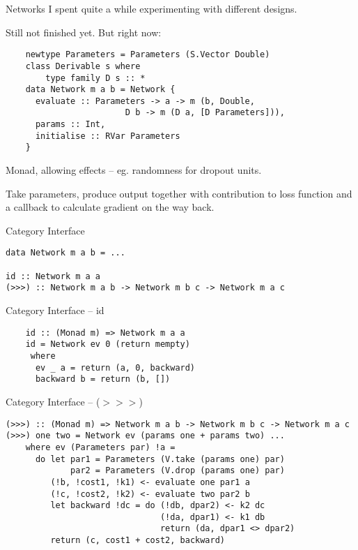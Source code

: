 \documentclass[10pt]{beamer}
\newenvironment{xframe}[1][]{\begin{frame}[fragile,environment=xframe,#1]}{\end{frame}}
\begin{document}
\begin{xframe}{Networks}
  I spent quite a while experimenting with different designs.

  Still not finished yet. But right now:

  \begin{verbatim}
    newtype Parameters = Parameters (S.Vector Double)
    class Derivable s where
        type family D s :: *
    data Network m a b = Network {
      evaluate :: Parameters -> a -> m (b, Double,
                        D b -> m (D a, [D Parameters])),
      params :: Int,
      initialise :: RVar Parameters
    }
  \end{verbatim}

  Monad, allowing effects -- eg. randomness for dropout units.

  Take parameters, produce output together with contribution to loss function and a callback to calculate gradient on the way back.
\end{xframe}




\begin{xframe}{Category Interface}
  \begin{verbatim}
data Network m a b = ...

id :: Network m a a
(>>>) :: Network m a b -> Network m b c -> Network m a c
  \end{verbatim}
\end{xframe}

\begin{xframe}{Category Interface -- id}
  \begin{verbatim}
    id :: (Monad m) => Network m a a
    id = Network ev 0 (return mempty)
     where
      ev _ a = return (a, 0, backward)
      backward b = return (b, [])
  \end{verbatim}
\end{xframe}

\begin{xframe}{Category Interface -- ($>>>$)}
  \begin{verbatim}
(>>>) :: (Monad m) => Network m a b -> Network m b c -> Network m a c
(>>>) one two = Network ev (params one + params two) ...
    where ev (Parameters par) !a =
      do let par1 = Parameters (V.take (params one) par)
             par2 = Parameters (V.drop (params one) par)
         (!b, !cost1, !k1) <- evaluate one par1 a
         (!c, !cost2, !k2) <- evaluate two par2 b
         let backward !dc = do (!db, dpar2) <- k2 dc
                               (!da, dpar1) <- k1 db
                               return (da, dpar1 <> dpar2)
         return (c, cost1 + cost2, backward)
  \end{verbatim}
\end{xframe}
\end{document}
